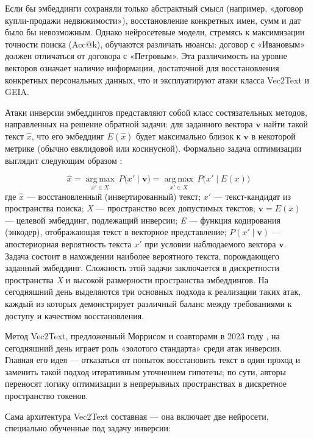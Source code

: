 \documentclass[a4paper, 12pt, oneside, openany]{article}
\begin{document}
Если бы эмбеддинги сохраняли только абстрактный смысл (например, «договор купли-продажи недвижимости»), восстановление конкретных имен, сумм и дат было бы невозможным. Однако нейросетевые модели, стремясь к максимизации точности поиска (Acc@k), обучаются различать нюансы: договор с «Ивановым» должен отличаться от договора с «Петровым». Эта различимость на уровне векторов означает наличие информации, достаточной для восстановления конкретных персональных данных, что и эксплуатируют атаки класса Vec2Text и GEIA.

Атаки инверсии эмбеддингов представляют собой класс состязательных методов, направленных на решение обратной задачи: для заданного вектора $\mathbf{v}$ найти такой текст $\hat{x}$, что его эмбеддинг $E(\hat{x})$ будет максимально близок к $\mathbf{v}$ в некоторой метрике (обычно евклидовой или косинусной). Формально задача оптимизации выглядит следующим образом \cite{ref5}:

\begin{equation}
	\hat{x} = \operatorname*{arg\,max}_{x' \in X}\, P\bigl( x' \mid \mathbf{v} \bigr) = \operatorname*{arg\,max}_{x' \in X}\, P\bigl( x' \mid E(x) \bigr)
	\label{eq:1-6}
\end{equation}
где $\hat{x}$ --- восстановленный (инвертированный) текст; \(x'\) --- текст-кандидат из пространства поиска; \emph{X} --- пространство всех допустимых текстов; $\mathbf{v} = E(x)$ --- целевой эмбеддинг, подлежащий инверсии; \emph{E} --- функция кодирования (энкодер), отображающая текст в векторное представление; $P(x' \mid \mathbf{v})$ --- апостериорная вероятность текста \(x'\) при условии наблюдаемого вектора $\mathbf{v}$. Задача состоит в нахождении наиболее вероятного текста, порождающего заданный эмбеддинг. Сложность этой задачи заключается в дискретности пространства \emph{X} и высокой размерности пространства эмбеддингов. На сегодняшний день выделяются три основных подхода к реализации таких атак, каждый из которых демонстрирует различный баланс между требованиями к доступу и качеством восстановления.

Метод Vec2Text, предложенный Моррисом и соавторами в 2023 году \cite{ref5}, на сегодняшний день играет роль «золотого стандарта» среди атак инверсии. Главная его идея — отказаться от попыток восстановить текст в один проход и заменить такой подход итеративным уточнением гипотезы; по сути, авторы переносят логику оптимизации в непрерывных пространствах в дискретное пространство токенов.

Сама архитектура Vec2Text составная — она включает две нейросети, специально обученные под задачу инверсии:
\end{document}
